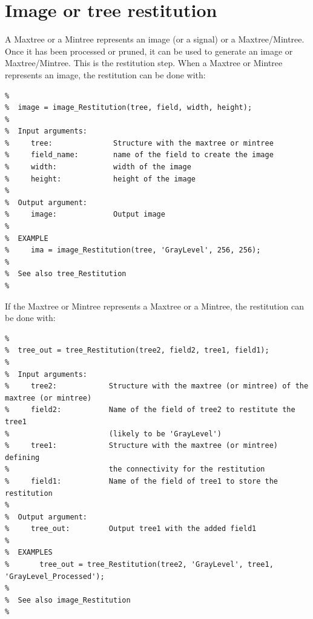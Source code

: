 \documentclass[DIV=calc, paper=a4, fontsize=11pt]{scrartcl}	 %
\begin{document}
\section{Image or tree restitution}
A Maxtree or a Mintree represents an image (or a signal) or a Maxtree/Mintree. Once it has been processed or pruned, it can be used to generate an image or Maxtree/Mintree. This is the restitution step. When a Maxtree or Mintree represents an image, the restitution can be done with: 
\begin{lstlisting}[aboveskip=0.5 \baselineskip]
%  image_Restitution restores an image from a mintree or a maxtree.
%
%  image = image_Restitution(tree, field, width, height);
%
%  Input arguments:
%     tree:              Structure with the maxtree or mintree 
%     field_name:        name of the field to create the image
%     width:             width of the image
%     height:            height of the image
%
%  Output argument:
%     image:             Output image 
% 
%  EXAMPLE 
%     ima = image_Restitution(tree, 'GrayLevel', 256, 256);
%
%  See also tree_Restitution
%
\end{lstlisting}

If the Maxtree or Mintree represents a Maxtree or a Mintree, the restitution can be done with: 
\begin{lstlisting}[aboveskip=0.5 \baselineskip]
%  tree_Restitution restitutes a tree field from a mintree or a maxtree 
%
%  tree_out = tree_Restitution(tree2, field2, tree1, field1);
%
%  Input arguments:
%     tree2:            Structure with the maxtree (or mintree) of the maxtree (or mintree) 
%     field2:           Name of the field of tree2 to restitute the tree1
%                       (likely to be 'GrayLevel')
%     tree1:            Structure with the maxtree (or mintree) defining 
%                       the connectivity for the restitution 
%     field1:           Name of the field of tree1 to store the restitution
%
%  Output argument:
%     tree_out:         Output tree1 with the added field1 
%
%  EXAMPLES
%       tree_out = tree_Restitution(tree2, 'GrayLevel', tree1, 'GrayLevel_Processed');
%
%  See also image_Restitution
% 
\end{lstlisting}

%
%
\end{document}
